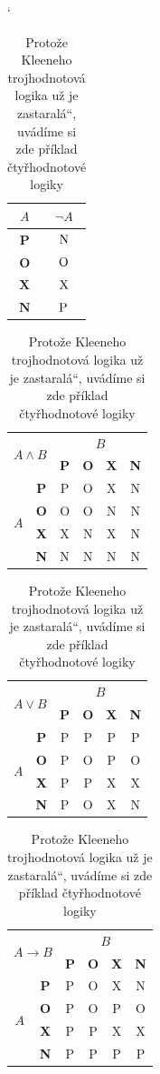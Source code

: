 \documentclass[czech,a4paper,11pt]{article}
\providecommand{\myuv}[1]{\quotedblbase #1\textquotedblleft}
\begin{document}
\begin{table}[h] 
\begin{center}
\catcode` 
\begin{tabular}{|c|c|} 
\hline
$A$ & $\neg A$\\ \hline
$\textbf{P}$ & $\textnormal{N}$\\ \hline
$\textbf{O}$ & $\textnormal{O}$\\ \hline
$\textbf{X}$ & $\textnormal{X}$\\ \hline
$\textbf{N}$ & $\textnormal{P}$\\
\hline
\end{tabular}
\begin{tabular}{|c|c|c|c|c|c|} \hline
\multicolumn{2}{|l|}{\multirow{2}{*}{$A \wedge B$}} & \multicolumn{4}{c|}{$B$}  \\ \cline{3-6} 
\multicolumn{2}{|c|}{} & \textbf{P} & \textbf{O} & \textbf{X} & \textbf{N} \\ \hline
\multirow{4}{*}{$A$} & \textbf{P} & P & O & X & N \\ \cline{2-6} 
 & \textbf{O} & O & O & N & N \\ \cline{2-6}  
 & \textbf{X} & X & N & X & N \\ \cline{2-6} 
 & \textbf{N} & N & N & N & N \\ \hline 
\end{tabular}
\begin{tabular}{|c|c|c|c|c|c|} \hline
\multicolumn{2}{|l|}{\multirow{2}{*}{$A \vee B$}} & \multicolumn{4}{c|}{$B$}  \\ \cline{3-6} 
\multicolumn{2}{|c|}{} & \textbf{P} & \textbf{O} & \textbf{X} & \textbf{N} \\ \hline
\multirow{4}{*}{$A$} & \textbf{P} & P & P & P & P \\ \cline{2-6} 
 & \textbf{O} & P & O & P & O \\ \cline{2-6}  
 & \textbf{X} & P & P & X & X \\ \cline{2-6} 
 & \textbf{N} & P & O & X & N \\ \hline 
\end{tabular}
\begin{tabular}{|c|c|c|c|c|c|} \hline
\multicolumn{2}{|l|}{\multirow{2}{*}{$A \rightarrow B$}} & \multicolumn{4}{c|}{$B$}  \\ \cline{3-6} 
\multicolumn{2}{|c|}{} & \textbf{P} & \textbf{O} & \textbf{X} & \textbf{N} \\ \hline
\multirow{4}{*}{$A$} & \textbf{P} & P & O & X & N \\ \cline{2-6} 
 & \textbf{O} & P & O & P & O \\ \cline{2-6}  
 & \textbf{X} & P & P & X & X \\ \cline{2-6} 
 & \textbf{N} & P & P & P & P \\ \hline 
\end{tabular}
\caption{Protože Kleeneho trojhodnotová logika už je \myuv{zastaralá}, uvádíme si zde příklad čtyřhodnotové logiky}
\label{logic}
\end{center}
\end{table}
\pagebreak
\end{document}
